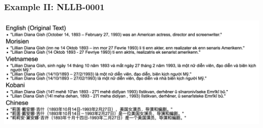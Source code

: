 \documentclass[aspectratio=169]{beamer}
\begin{document}
\begin{frame}[fragile]
	\frametitle{Example II: NLLB-0001}
    \includegraphics[width=\textwidth]{images/example-nllb-1.png}

\end{frame}
\end{document}
